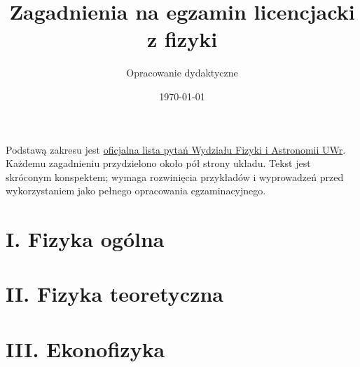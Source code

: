 \documentclass[11pt,a4paper]{article}
\title{Zagadnienia na egzamin licencjacki z fizyki}
\author{Opracowanie dydaktyczne}
\date{\today}
\begin{document}
\maketitle
Podstawą zakresu jest
\href{https://wfa.uwr.edu.pl/wp-content/uploads/sites/216/2025/10/Pytania-lic-Fizyka-I-st.pdf}
{oficjalna lista pytań Wydziału Fizyki i Astronomii UWr}.
Każdemu zagadnieniu przydzielono około pół strony układu.
Tekst jest skróconym konspektem; wymaga rozwinięcia przykładów
i wyprowadzeń przed wykorzystaniem jako pełnego opracowania
egzaminacyjnego.
\newpage
\section*{I. Fizyka ogólna}


\section*{II. Fizyka teoretyczna}


\section*{III. Ekonofizyka}

\end{document}
